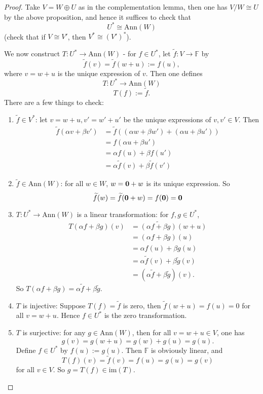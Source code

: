 \documentclass[11pt,openany]{book}
\theoremstyle{plain}
\theoremstyle{definition}
\theoremstyle{remark}
\begin{document}
\begin{proof}
    Take $V = W \oplus U$ as in the complementation lemma, then one has $V/W \cong U$ by the above proposition, and hence it suffices to check that
    $$U^* \cong \mathrm{Ann}(W)$$
    (check that if $V \cong V'$, then $V^* \cong (V')^*$). 

    We now construct $T: U^* \to \mathrm{Ann}(W)$ - for $f \in U^*$, let
    $\widetilde{f}: V \to \mathbb{F}$ by
    $$\widetilde{f}(v) = \widetilde{f}(w+u) := f(u),$$
    where $v = w +u$ is the unique expression of $v$. Then one defines
$$T: U^* \to \mathrm{Ann}(W)$$
    $$T(f) := \widetilde{f}.$$
    There are a few things to check:
    \begin{enumerate}
        \item $\widetilde{f} \in V^*$: let $v = w + u, v' = w' + u'$ be the unique expressions of $v, v' \in V$. Then        
        \begin{align*}
        \widetilde{f}(\alpha v + \beta v') &= \widetilde{f}((\alpha w + \beta w') + (\alpha u + \beta u'))\\ &= f(\alpha u + \beta u')\\ &= \alpha f(u) + \beta f(u')\\ &= \alpha \widetilde{f}(v) + \beta \widetilde{f}(v') \end{align*}
        \item $\widetilde{f} \in \mathrm{Ann}(W)$: for all $w \in W$, $w = {\bf 0} + w$ is its unique expression. So
        $$\widetilde{f}(w) = \widetilde{f}({\bf 0} + w) = f(\bf 0) = 0$$
        \item $T: U^* \to \mathrm{Ann}(W)$ is a linear transformation: for  $f, g \in U^*$, 
        \begin{align*}
        T(\alpha f+ \beta g)(v) &= \widetilde{(\alpha f+ \beta g)}(w+u)\\ 
        &= (\alpha f+ \beta g)(u)\\  &= \alpha f(u)+ \beta g(u) \\
        &= \alpha \widetilde{f}(v)+ \beta \widetilde{g}(v) \\
        &= (\alpha \widetilde{f}+ \beta \widetilde{g})(v). \end{align*}
        So $T(\alpha f+ \beta g) = \alpha \widetilde{f}+ \beta \widetilde{g}$.

        \item $T$ is injective: Suppose $T(f) = \widetilde{f}$ is zero, then
        $\widetilde{f}(w+u) = f(u) = 0$ for all $v = w + u$. Hence $f \in U^*$ is the zero transformation.

        \item $T$ is surjective: for any $g \in \mathrm{Ann}(W)$, then for all $v = w + u \in V$, one has
         $$g(v) = g(w+u) = g(w)+g(u) = g(u).$$
        Define $f \in U^*$ by $f(u) := g(u)$. Then $\mathbb{F}$ is obviously linear, and 
        $$T(f)(v) = \widetilde{f}(v) = f(u) = g(u) = g(v)$$
        for all $v \in V$. So $g = T(f) \in \mathrm{im}(T)$.
    \end{enumerate}
\end{proof}
\end{document}
